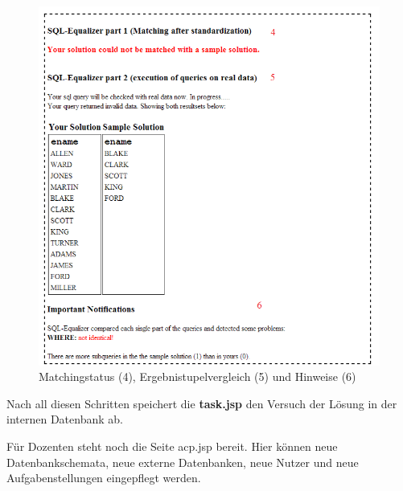 \begin{figure}[h]
\centering
\includegraphics[scale=0.7]{Bilder/screen_prog2}
\caption{Matchingstatus (4), Ergebnistupelvergleich (5) und Hinweise (6)}
\label{fig:screen_prog2}
\end{figure}

Nach all diesen Schritten speichert die \textbf{task.jsp} den Versuch der Lösung in der internen Datenbank ab.

Für Dozenten steht noch die Seite acp.jsp bereit. Hier können neue Datenbankschemata, neue externe Datenbanken, neue Nutzer und neue Aufgabenstellungen eingepflegt werden.
